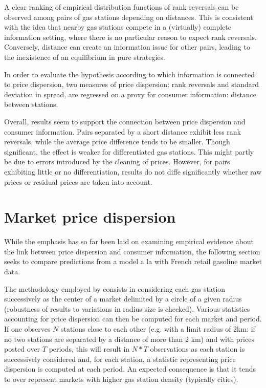 \documentclass[english]{article}
\begin{document}
{\renewcommand{\arraystretch}{1.0}

A clear ranking of empirical distribution functions of rank reversals can be observed among pairs of gas stations depending on distances. This is consistent with the idea that nearby gas stations compete in a (virtually) complete information setting, where there is no particular reason to expect rank reversals. Conversely, distance can create an information issue for other pairs, leading to the inexistence of an equilibrium in pure strategies.

In order to evaluate the hypothesis according to which information is connected to price dispersion, two measures of price dispersion: rank reversals and standard deviation in spread, are regressed on a proxy for consumer information: distance between stations.



Overall, results seem to support the connection between price dispersion and consumer information. Pairs separated by a short distance exhibit less rank reversals, while the average price difference tends to be smaller. Though significant, the effect is weaker for differentiated gas stations. This might partly be due to errors introduced by the cleaning of prices. However, for pairs exhibiting little or no differentiation, results do not diffe significantly whether raw prices or residual prices are taken into account.

\section{Market price dispersion}

While the emphasis has so far been laid on examining empirical evidence about the link between price dispersion and consumer information, the following section seeks to compare predictions from a model a la \cite{VAR80} with French retail gasoline market data.

The methodology employed by \cite{TAP11} consists in considering each gas station successively as the center of a market delimited by a circle of a given radius (robustness of results to variations in radius size is checked). Various statistics accounting for price dispersion can then be computed for each market and period. If one observes $N$ stations close to each other (e.g. with a limit radius of 2km: if no two stations are separated by a distance of more than 2 km) and with prices posted over $T$ periods, this will result in $N*T$ observations as each station is successively considered and, for each station, a statistic representing price dispersion is computed at each period. An expected consequence is that it tends to over represent markets with higher gas station density (typically cities).

}
\end{document}
